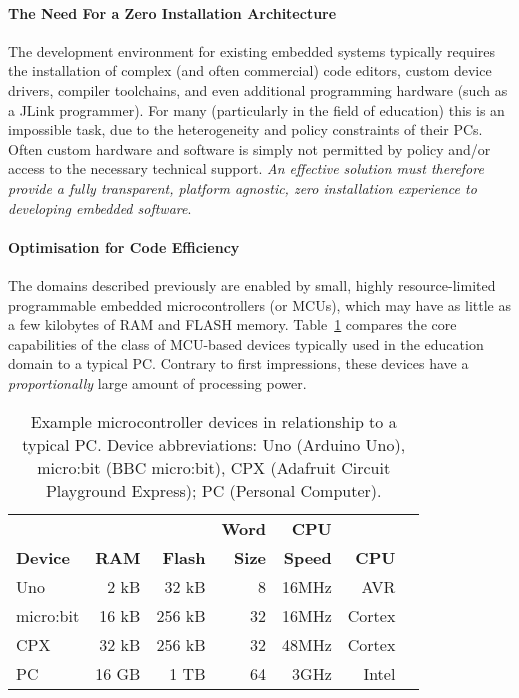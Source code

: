 \paragraph{The Need For a Zero Installation Architecture}
The development environment for existing embedded systems typically requires the installation of complex (and often commercial) code editors, custom device drivers, compiler toolchains, and even additional programming hardware (such as a JLink programmer). For many (particularly in the field of education) this is an impossible task, due to the heterogeneity and policy constraints of their PCs. Often custom hardware and software is simply not permitted by policy and/or access to the necessary technical support. \emph{An effective solution must therefore provide a fully transparent, platform agnostic, zero installation experience to developing embedded software}.

\paragraph{Optimisation for Code Efficiency}
The domains described previously are enabled by small, highly resource-limited programmable embedded microcontrollers (or MCUs), which may have as little as a few kilobytes of RAM and FLASH memory.
Table~\ref{table:devices} compares the core capabilities of the class of MCU-based devices typically used in the education domain to a typical PC. Contrary to first impressions, these devices have a \emph{proportionally} large amount of processing power.

\begin{table}[h]
    \centering
    \begin{tabular}{|l|r|r|r|r|r|r|}
    \hline
                           &          &              & \bf{Word}  & \bf{CPU} &            \\
    \bf{Device}            & \bf{RAM} & \bf{Flash}   & \bf{Size}  & \bf{Speed} & \bf{CPU}  \\ \hline
    Uno            & 2 kB       & 32 kB      & 8          & 16MHz & AVR       \\ \hline
    micro:bit          & 16 kB      & 256 kB     & 32         & 16MHz & Cortex     \\ \hline
    CPX           & 32 kB      & 256 kB     & 32         & 48MHz & Cortex    \\ \hline
    PC             & 16 GB      & 1 TB       & 64         & 3GHz & Intel      \\ \hline
    \end{tabular}
    \setlength{\textfloatsep}{-10pt}
    \caption{\label{table:devices}Example microcontroller devices in relationship to a typical PC. Device abbreviations: Uno (Arduino Uno), micro:bit (BBC micro:bit), CPX (Adafruit Circuit Playground Express); PC (Personal Computer).}
    \vspace{-20pt}
\end{table}

